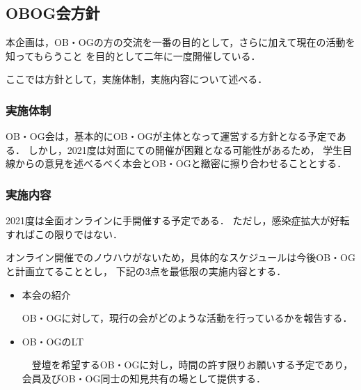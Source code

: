 \subsection*{OBOG会方針}


本企画は，OB・OGの方の交流を一番の目的として，さらに加えて現在の活動を知ってもらうこと
を目的として二年に一度開催している．

ここでは方針として，実施体制，実施内容について述べる．

\subsubsection*{実施体制}

OB・OG会は，基本的にOB・OGが主体となって運営する方針となる予定である．
しかし，2021度は対面にての開催が困難となる可能性があるため，
学生目線からの意見を述べるべく本会とOB・OGと緻密に擦り合わせることとする．

\subsubsection*{実施内容}

2021度は全面オンラインに手開催する予定である．
ただし，感染症拡大が好転すればこの限りではない．

オンライン開催でのノウハウがないため，具体的なスケジュールは今後OB・OGと計画立てることとし，
下記の3点を最低限の実施内容とする．

\begin{itemize}
    \item 本会の紹介

        OB・OGに対して，現行の会がどのような活動を行っているかを報告する．
    \item OB・OGのLT

        　登壇を希望するOB・OGに対し，時間の許す限りお願いする予定であり，会員及びOB・OG同士の知見共有の場として提供する．
\end{itemize}

